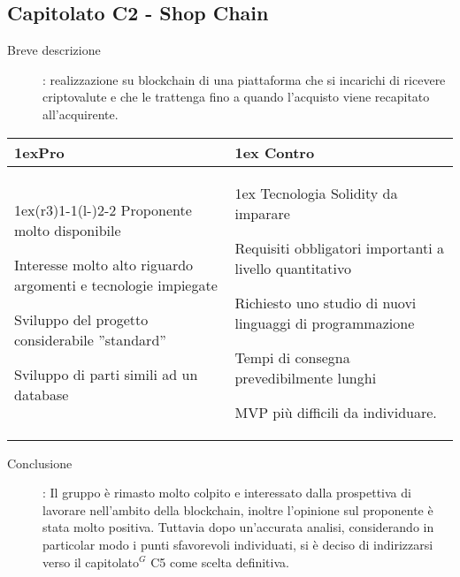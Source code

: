 \subsection{Capitolato C2 - Shop Chain}
\begin{description}
\item [Breve descrizione]: realizzazione su blockchain di una piattaforma che si incarichi di ricevere criptovalute e che le trattenga fino a quando l'acquisto viene recapitato all’acquirente.
\end{description}
\begin{table}[h]
\begin{tabularx}{\linewidth}{>{\parskip1ex}X@{\kern4\tabcolsep}>{\parskip1ex}X}
\hfil\bfseries Pro
&
\hfil\bfseries Contro
\\\cmidrule(r{3\tabcolsep}){1-1}\cmidrule(l{-\tabcolsep}){2-2}
Proponente molto disponibile \par
Interesse molto alto riguardo argomenti e tecnologie impiegate \par
Sviluppo del progetto considerabile ”standard” \par
Sviluppo di parti simili ad un database
&
Tecnologia Solidity da imparare \par 
Requisiti obbligatori importanti a livello quantitativo \par
Richiesto uno studio di nuovi linguaggi di programmazione \par
Tempi di consegna prevedibilmente lunghi \par
MVP più difficili da individuare. \\
\end{tabularx}
\end{table}
\begin{description}
	\item [Conclusione]: Il gruppo è rimasto molto colpito e interessato dalla prospettiva di lavorare nell'ambito della blockchain, inoltre l'opinione sul proponente è stata molto positiva. Tuttavia dopo un'accurata analisi, considerando in particolar modo i punti sfavorevoli individuati, si è deciso di indirizzarsi verso il capitolato$^{G}$ C5 come scelta definitiva.
\end{description}

\vspace{1cm}

